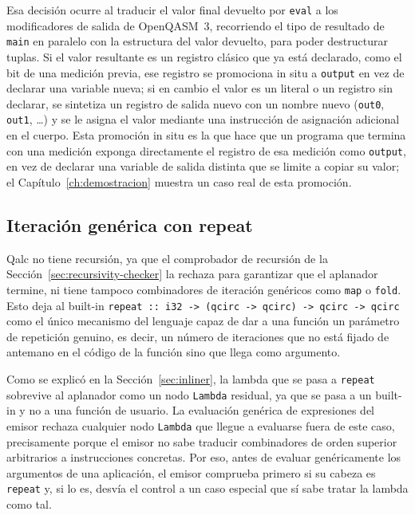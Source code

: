 Esa decisión ocurre al traducir el valor final devuelto por \lstinline|eval| a los modificadores de salida de OpenQASM~3, recorriendo el tipo de resultado de \lstinline|main| en paralelo con la estructura del valor devuelto, para poder destructurar tuplas. Si el valor resultante es un registro clásico que ya está declarado, como el bit de una medición previa, ese registro se promociona in situ a \lstinline|output| en vez de declarar una variable nueva; si en cambio el valor es un literal o un registro sin declarar, se sintetiza un registro de salida nuevo con un nombre nuevo (\lstinline|out0|, \lstinline|out1|, \ldots) y se le asigna el valor mediante una instrucción de asignación adicional en el cuerpo. Esta promoción in situ es la que hace que un programa que termina con una medición exponga directamente el registro de esa medición como \lstinline|output|, en vez de declarar una variable de salida distinta que se limite a copiar su valor; el Capítulo~\ref{ch:demostracion} muestra un caso real de esta promoción.

\subsection{Iteración genérica con repeat}
\label{sec:repeat}

Qalc no tiene recursión, ya que el comprobador de recursión de la Sección~\ref{sec:recursivity-checker} la rechaza para garantizar que el aplanador termine, ni tiene tampoco combinadores de iteración genéricos como \lstinline|map| o \lstinline|fold|. Esto deja al built-in \lstinline|repeat :: i32 -> (qcirc -> qcirc) -> qcirc -> qcirc| como el único mecanismo del lenguaje capaz de dar a una función un parámetro de repetición genuino, es decir, un número de iteraciones que no está fijado de antemano en el código de la función sino que llega como argumento.

Como se explicó en la Sección~\ref{sec:inliner}, la lambda que se pasa a \lstinline|repeat| sobrevive al aplanador como un nodo \lstinline|Lambda| residual, ya que se pasa a un built-in y no a una función de usuario. La evaluación genérica de expresiones del emisor rechaza cualquier nodo \lstinline|Lambda| que llegue a evaluarse fuera de este caso, precisamente porque el emisor no sabe traducir combinadores de orden superior arbitrarios a instrucciones concretas. Por eso, antes de evaluar genéricamente los argumentos de una aplicación, el emisor comprueba primero si su cabeza es \lstinline|repeat| y, si lo es, desvía el control a un caso especial que sí sabe tratar la lambda como tal.

